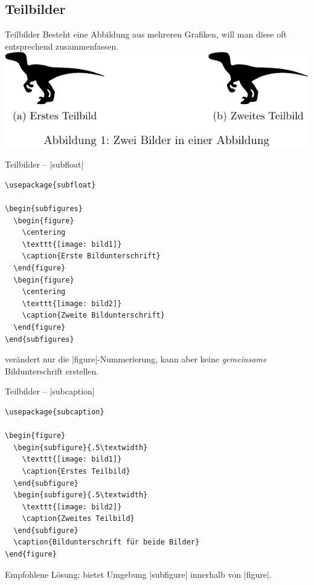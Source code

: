\documentclass[
	vorläufig=true,
	datum=2017-11-24,
	titel={Grafiken, Abbildungen, TikZ},
	web=true,
	mo,
]{../tex/latexkurs-slides}
\begin{document}
\subsection{Teilbilder}
\begin{frame}{Teilbilder}
Besteht eine Abbildung aus mehreren Grafiken, will man diese oft entsprechend zusammenfassen. \vfill
\centering
\includegraphics{05_subcaption}
\end{frame}

\begin{frame}[fragile]{Teilbilder – |subfloat|}
\begin{lstlisting}
\usepackage{subfloat}

\begin{subfigures}
  \begin{figure}
    \centering
    \texttt{[image: bild1]}
    \caption{Erste Bildunterschrift}
  \end{figure}
  \begin{figure}
    \centering
    \texttt{[image: bild2]}
    \caption{Zweite Bildunterschrift}
  \end{figure}
\end{subfigures}
\end{lstlisting}
 verändert nur die |figure|-Nummerierung, kann aber keine \emph{gemeinsame} Bildunterschrift erstellen.
\end{frame}



\begin{frame}[fragile]{Teilbilder – |subcaption|}
\begin{lstlisting}
\usepackage{subcaption}

\begin{figure}
  \begin{subfigure}{.5\textwidth}
    \texttt{[image: bild1]}
    \caption{Erstes Teilbild}
  \end{subfigure}
  \begin{subfigure}{.5\textwidth}
    \texttt{[image: bild2]}
    \caption{Zweites Teilbild}
  \end{subfigure}
  \caption{Bildunterschrift für beide Bilder}
\end{figure}
\end{lstlisting}

Empfohlene Lösung:   bietet Umgebung |subfigure| innerhalb von |figure|.
\end{frame}
\end{document}
